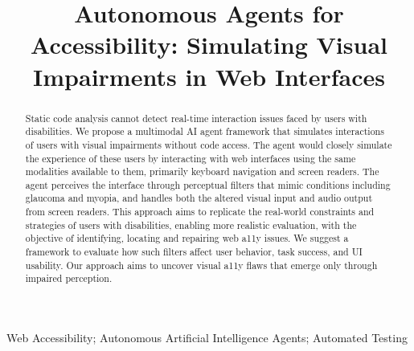 \documentclass[10pt, conference]{IEEEtran}
\begin{document}
\title{Autonomous Agents for Accessibility: Simulating Visual Impairments in Web Interfaces}

\author{
}

\maketitle

\begin{abstract}
Static code analysis cannot detect real-time interaction issues faced by users with disabilities. We propose a multimodal \ac{AI} agent framework that simulates interactions of users with visual impairments without code access. 
The agent would closely simulate the experience of these users by interacting with web interfaces using the same modalities available to them, primarily keyboard navigation and screen readers. The agent perceives the interface through perceptual filters that mimic conditions including glaucoma and myopia, and handles both the altered visual input and audio output from screen readers. 
This approach aims to replicate the real-world constraints and strategies of users with disabilities, enabling more realistic evaluation, with the objective of identifying, locating and repairing web \ac{a11y} issues. 
We suggest a framework to evaluate how such filters affect user behavior, task success, and \ac{UI} usability. Our approach aims to uncover visual \ac{a11y} flaws that emerge only through impaired perception. 
\end{abstract}

\begin{IEEEkeywords}
Web Accessibility; Autonomous Artificial Intelligence Agents; Automated Testing
\end{IEEEkeywords}









\balance


\end{document}
